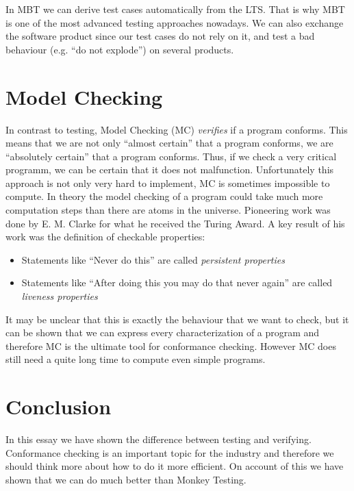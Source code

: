 \documentclass[a4paper, 12pt]{article} %
\begin{document}
In MBT we can derive test cases automatically from the LTS. That is why MBT
is one of the most advanced testing approaches nowadays. We can also exchange
the software product since our test cases do not rely on it, and test a bad
behaviour (e.g. ``do not explode'') on several products. 

\section*{Model Checking}
In contrast to testing, Model Checking (MC) \textit{verifies} if a program
conforms. This means that we are not only ``almost certain'' that a program
conforms, we are ``absolutely certain'' that a program conforms. Thus, if we
check a very critical programm, we can be certain that it does not malfunction.
Unfortunately this approach is not only very hard to implement, MC is sometimes
impossible to compute. In theory the model checking of a program could take much
more computation steps than there are atoms in the universe. Pioneering work was
done by E. M. Clarke for what he received the Turing Award. A key result of
his work was the definition of checkable properties:
\begin{itemize}
  \item Statements like ``Never do {\color{red}this}'' are called
  \textit{persistent properties}
  \item Statements like ``After doing {\color{red}this} you may do
  {\color{blue}that} never again'' are called \textit{liveness properties}
\end{itemize}

It may be unclear that this is exactly the behaviour that we want to check, but
it can be shown that we can express every characterization of a program and
therefore MC is the ultimate tool for conformance checking. However MC does
still need a quite long time to compute even simple programs. 


\section*{Conclusion}
In this essay we have shown the difference between testing and verifying. 
Conformance checking is an important topic for the industry and therefore we
should think more about how to do it more efficient. On account of this we have
shown that we can do much better than Monkey Testing.





\end{document}
